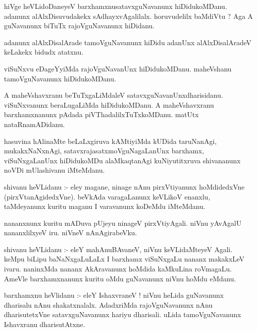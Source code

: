 \documentclass{article}
\begin{document}
\begin{mn}
hiVge  heVLidoDaneyeV  barxhamxnusatavxguNavanunx  hiDidukoMDanu.  adanunx  alAlxDisuvudakekx  
sAdhayxvAgalilalx.  horuvudelilx baMdiVtu ?  Aga  A  guNavanunx  biTuTx  rajoVguNavanunx  hiDidanu.
\end{mn}

\begin{mn}
adanunx  alAlxDisalArade  tamoVguNavanunx  hiDidu  adanUnx  alAlxDisalAradeV  keLakekx  bidudx  atatxnu.
\end{mn}

\begin{mn}
viSuNxvu  eDageYyiMda  rajoVguNavanUnx  hiDidukoMDanu.  maheVshanu  tamoVguNavanunx  hiDidukoMDanu.  
\end{mn}

\begin{mn}
A  maheVshavxranu  beTuTxgaLiMdaleV  satavxguNavanUnxdharisidanu.  viSuNxvanunx  beraLugaLiMda  
hiDidukoMDanu.  A  maheVshavxranu  barxhamxnanunx  pAdada  piVThadalilxTuTxkoMDanu.  matUtx  nataRnamADidanu.
\end{mn}

\begin{mn}
hasuvina  hAlinaMte  beLaLxgiruva  kAMtiyiMda  kUDida  taruNanAgi,  mukakxNaNxnAgi,  satavxrajasatxmoVguNagaLanUnx  
barxhamx,  viSuNxgaLanUnx  hiDidukoMDu  alaMkaqtanAgi  kuNiyutitxruva  shivananunx  noVDi  mUlashivanu  iMteMdanu.
\end{mn}

\begin{mn}
shivanu  heVLidanu :- eley  magane,  ninage  nAnu  pirxVtiyanunx  hoMdidedxVne (pirxVtanAgidedxVne). beVkAda  
varagaLanunx  keVLikoV  enanxlu,  taMdeyanunx  kuritu  maganu  I  varavanunx  koDeMdu  iMteMdanu.
\end{mn}

\begin{mn}
nananxnunx  kuritu  mADuva  pUjeyu  ninageV  pirxVtiyAgali.  niVnu  yAvAgalU  nananxlilxyeV  iru.  niVneV  nAnAgirabeVku.
\end{mn}

\begin{mn}
shivanu  heVLidanu :- eleY  mahAnuBAvaneV,  niVnu  keVLidaMteyeV  Agali.  keMpu  biLipu  baNaNxgaLuLaLx  I  
barxhamx viSuNxgaLu  nananx makakxLeV  ivaru.  naninxMda  nananx  AkAravanunx  hoMdida  kaMkuLina  roVmagaLu.  
AmeVle  barxhamxnanunx  kuritu  oMdu  guNavanunx  niVnu  hoMdu  eMdanu.
\end{mn}

\begin{mn}
barxhamxnu  heVlidanu :- eleY  IshaxvraneV !  niVnu  heLida  guNavanunx  dharisalu  nAnu  shakatxnalalx.  AdadxriMda  
rajoVguNavanunx  nAnu  dharisutetxVne  satavxguNavanunx  hariyu  dharisali.  uLida  tamoVguNavanunx  Ishavxranu  dharisutAtxne.
\end{mn}
\end{document}
